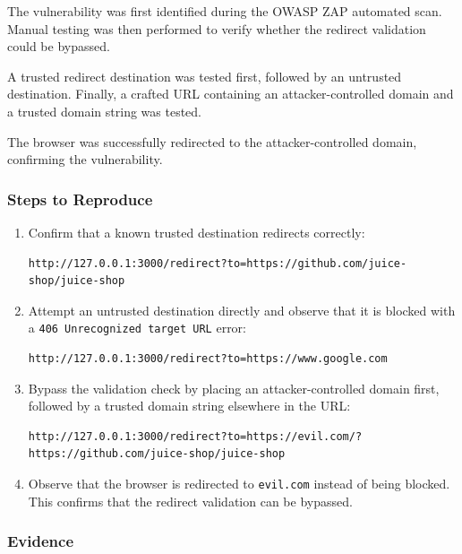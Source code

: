 The vulnerability was first identified during the OWASP ZAP
automated scan. Manual testing was then performed to verify whether
the redirect validation could be bypassed.

A trusted redirect destination was tested first, followed by an
untrusted destination. Finally, a crafted URL containing an
attacker-controlled domain and a trusted domain string was tested.

The browser was successfully redirected to the attacker-controlled
domain, confirming the vulnerability.

\subsubsection*{Steps to Reproduce}

\begin{enumerate}

    \item Confirm that a known trusted destination redirects
    correctly:

    \begin{lstlisting}
http://127.0.0.1:3000/redirect?to=https://github.com/juice-shop/juice-shop
    \end{lstlisting}

    \item Attempt an untrusted destination directly and observe that
    it is blocked with a \texttt{406 Unrecognized target URL} error:

    \begin{lstlisting}
http://127.0.0.1:3000/redirect?to=https://www.google.com
    \end{lstlisting}

    \item Bypass the validation check by placing an
    attacker-controlled domain first, followed by a trusted domain
    string elsewhere in the URL:

    \begin{lstlisting}
http://127.0.0.1:3000/redirect?to=https://evil.com/?https://github.com/juice-shop/juice-shop
    \end{lstlisting}

    \item Observe that the browser is redirected to
    \texttt{evil.com} instead of being blocked. This confirms that
    the redirect validation can be bypassed.

\end{enumerate}

\subsubsection*{Evidence}

